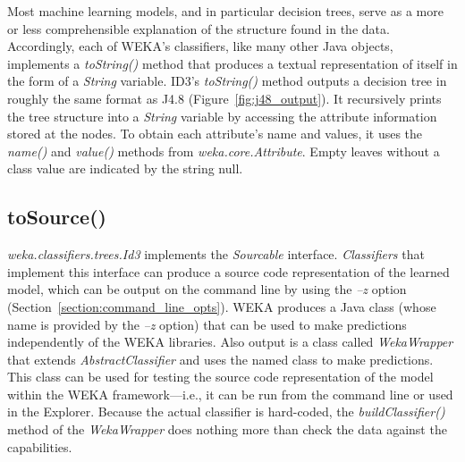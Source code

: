 Most machine learning models, and in particular decision trees, serve
as a more or less comprehensible explanation of the structure found in
the data. Accordingly, each of WEKA's classifiers, like many other
Java objects, implements a \textit{toString()} method that produces a textual
representation of itself in the form of a \textit{String} variable. ID3's
\textit{toString()} method outputs a decision tree in roughly the same format
as J4.8 (Figure~\ref{fig:j48_output}). It recursively prints the tree structure into a
\textit{String} variable by accessing the attribute information stored at the
nodes. To obtain each attribute's name and values, it uses
the \textit{name()} and \textit{value()} methods
from \textit{weka.core.Attribute}. Empty leaves without a class value
are indicated by the string null.

\subsection{toSource()}

\textit{weka.classifiers.trees.Id3} implements the \textit{Sourcable}
interface. \textit{Classifiers} that implement this interface can
produce a source code representation of the learned model, which can
be output on the command line by using the \textit{--z} option
(Section~\ref{section:command_line_opts}). WEKA produces a Java class
(whose name is provided by the \textit{--z} option) that can be used
to make predictions independently of the WEKA libraries. Also output
is a class called \textit{WekaWrapper} that extends
\textit{AbstractClassifier} and uses the named class to make predictions. This class
can be used for testing the source code representation of the model
within the WEKA framework---i.e., it can be run from the command line or
used in the Explorer. Because the actual classifier is hard-coded, the
\textit{buildClassifier()} method of the \textit{WekaWrapper} does nothing more than
check the data against the capabilities.

